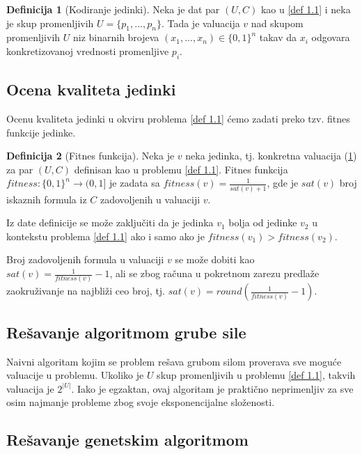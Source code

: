 \documentclass[12pt, a4paper]{article}
\theoremstyle{definition}
\newtheorem{definition}{Definicija}[section]
\begin{document}
\begin{definition}[Kodiranje jedinki]
\label{def 2.1}
Neka je dat par $(U, C)$ kao u \ref{def 1.1} i neka je skup promenljivih $U = \{p_1, ..., p_n\}$. Tada je valuacija $v$ nad skupom promenljivih $U$ niz binarnih brojeva $(x_1, ..., x_n) \in \{0, 1\}^n$ takav da $x_i$ odgovara konkretizovanoj vrednosti promenljive $p_i$.
\end{definition}

\subsection{Ocena kvaliteta jedinki}

Ocenu kvaliteta jedinki u okviru problema \ref{def 1.1} ćemo zadati preko tzv. fitnes funkcije jedinke.

\begin{definition}[Fitnes funkcija]
\label{def 2.2}
Neka je $v$ neka jedinka, tj. konkretna valuacija (\ref{def 2.1}) za par $(U, C)$ definisan kao u problemu \ref{def 1.1}. Fitnes funkcija $fitness : \{0, 1\}^n \rightarrow (0, 1]$ je zadata sa $fitness(v) = \frac{1}{sat(v) + 1}$, gde je $sat(v)$ broj iskaznih formula iz $C$ zadovoljenih u valuaciji $v$.
\end{definition}

Iz date definicije se može zaključiti da je jedinka $v_1$ bolja od jedinke $v_2$ u kontekstu problema \ref{def 1.1} ako i samo ako je $fitness(v_1) > fitness(v_2)$.

Broj zadovoljenih formula u valuaciji $v$ se može dobiti kao $sat(v) = \frac{1}{fitness(v)} - 1$, ali se zbog računa u pokretnom zarezu predlaže zaokruživanje na najbliži ceo broj, tj.
$sat(v) = round(\frac{1}{fitness(v)} - 1)$.

\subsection{Rešavanje algoritmom grube sile}

Naivni algoritam kojim se problem rešava grubom silom proverava sve moguće valuacije u problemu. Ukoliko je $U$ skup promenljivih u problemu \ref{def 1.1}, takvih valuacija je $2^{|U|}$. Iako je egzaktan, ovaj algoritam je praktično neprimenljiv za sve osim najmanje probleme zbog svoje eksponencijalne složenosti.

\subsection{Rešavanje genetskim algoritmom}
\end{document}
